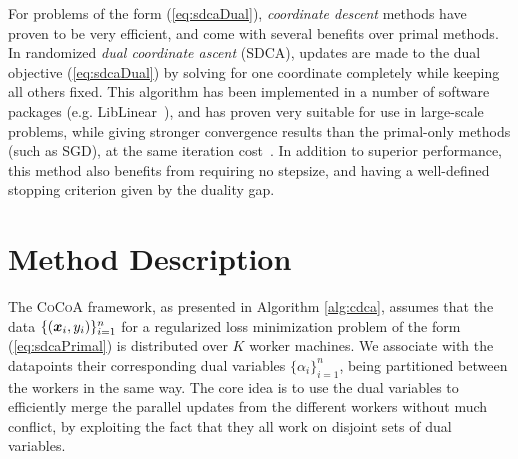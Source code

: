 \documentclass{article} %
\newcommand{\algname}{\textsc{CoCoA}\xspace}  %
\begin{document}
For problems of the form (\ref{eq:sdcaDual}), \emph{coordinate descent}
methods have proven to be very efficient, and come with several benefits over
primal methods.
In randomized \emph{dual coordinate ascent} (SDCA), updates are made to the
dual objective (\ref{eq:sdcaDual}) by solving for one coordinate completely
while keeping all others fixed. This algorithm has been implemented in a
number of software packages (e.g. \textsf{\small
LibLinear}~\cite{Hsieh:2008bd}), and has proven very suitable for
use in large-scale problems, while giving stronger convergence results than the
primal-only methods (such as SGD), at the same iteration
cost~\cite{ShalevShwartz:2013wl}. 
In addition to superior performance, this method also benefits from requiring
no stepsize, and having a well-defined stopping criterion given by the 
duality gap.



%
\section{Method Description} \label{method}

%

The \algname framework, as presented in Algorithm \ref{alg:cdca}, assumes that the data $\{(\bm{x}_i,y_i)\}_{i=1}^n$ for a regularized loss minimization problem of the form (\ref{eq:sdcaPrimal}) is distributed over $K$ worker machines.
We associate with the datapoints their corresponding dual variables $\{\alpha_i\}_{i=1}^n$, being partitioned between the workers in the same way.
The core idea is to use the dual variables to efficiently merge the parallel updates from the different workers without much conflict, by exploiting the fact that they all work on disjoint sets of dual variables.
\end{document}
